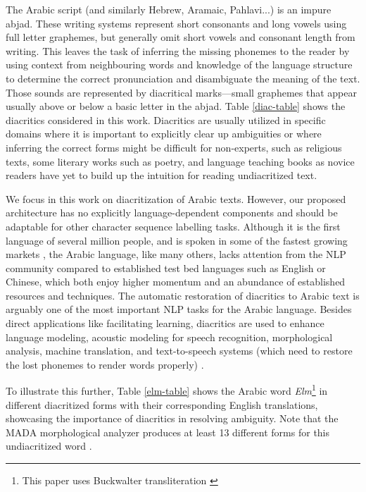 \documentclass[11pt]{article}
\begin{document}
The Arabic script (and similarly Hebrew, Aramaic, Pahlavi...) is an impure abjad. These writing systems represent short consonants and long vowels using full letter graphemes, but generally omit short vowels and consonant length from writing. This leaves the task of inferring the missing phonemes to the reader by using context from neighbouring words and knowledge of the language structure to determine the correct pronunciation and disambiguate the meaning of the text. Those sounds are represented by diacritical marks---small graphemes that appear usually above or below a basic letter in the abjad. Table \ref{diac-table} shows the diacritics considered in this work. Diacritics are usually utilized in specific domains where it is important to explicitly clear up ambiguities or where inferring the correct forms might be difficult for non-experts, such as religious texts, some literary works such as poetry, and language teaching books as novice readers have yet to build up the intuition for reading undiacritized text.

We focus in this work on diacritization of Arabic texts. However, our proposed architecture has no explicitly language-dependent components and should be adaptable for other character sequence labelling tasks. Although it is the first language of several million people, and is spoken in some of the fastest growing markets \cite{tinsley_board}, the Arabic language, like many others, lacks attention from the NLP community compared to established test bed languages such as English or Chinese, which both enjoy higher momentum and an abundance of established resources and techniques. The automatic restoration of diacritics to Arabic text is arguably one of the most important NLP tasks for the Arabic language. Besides direct applications like facilitating learning, diacritics are used to enhance language modeling, acoustic modeling for speech recognition, morphological analysis, machine translation, and text-to-speech systems (which need to restore the lost phonemes to render words properly) \cite{zitouni09,azmi_2013}.

To illustrate this further, Table \ref{elm-table} shows the Arabic word \textit{Elm}\footnote{This paper uses Buckwalter transliteration \label{foot:buckwalter}} in different diacritized forms with their corresponding English translations, showcasing the importance of diacritics in resolving ambiguity. Note that the MADA \cite{MADA} morphological analyzer produces at least 13 different forms for this undiacritized word \cite{belinkov-glass-2015-arabic}.
\end{document}

